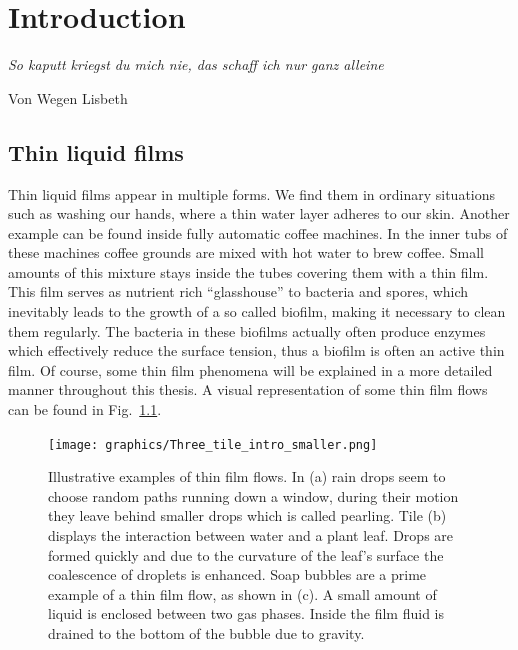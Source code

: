 \chapter{Introduction}
\label{chapter:intro}
\epigraph{\textit{So kaputt kriegst du mich nie, das schaff ich nur ganz alleine}}{Von Wegen Lisbeth}

\section{Thin liquid films}
Thin liquid films appear in multiple forms. 
We find them in ordinary situations such as washing our hands, where a thin water layer adheres to our skin. 
Another example can be found inside fully automatic coffee machines.
In the inner tubs of these machines coffee grounds are mixed with hot water to brew coffee. 
Small amounts of this mixture stays inside the tubes covering them with a thin film.
This film serves as nutrient rich ``glasshouse'' to bacteria and spores, which inevitably leads to the growth of a so called biofilm, making it necessary to clean them regularly.
The bacteria in these biofilms actually often produce enzymes which effectively reduce the surface tension, thus a biofilm is often an active thin film. 
Of course, some thin film phenomena will be explained in a more detailed manner throughout this thesis. 
A visual representation of some thin film flows can be found in Fig.~\ref{fig:examples_intro}.
\begin{figure}
    \centering
    \texttt{[image: graphics/Three\_tile\_intro\_smaller.png]}
    \caption{Illustrative examples of thin film flows. 
    In (a) rain drops seem to choose random paths running down a window, during their motion they leave behind smaller drops which is called pearling. 
    Tile (b) displays the interaction between water and a plant leaf. 
    Drops are formed quickly and due to the curvature of the leaf's surface the coalescence of droplets is enhanced. 
    Soap bubbles are a prime example of a thin film flow, as shown in (c). 
    A small amount of liquid is enclosed between two gas phases. Inside the film fluid is drained to the bottom of the bubble due to gravity.}
    \label{fig:examples_intro}
\end{figure}

